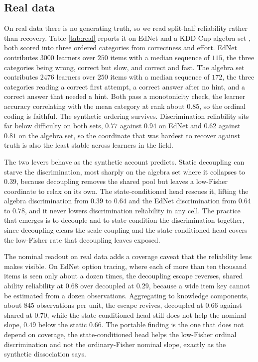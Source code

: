 \documentclass[sigconf,nonacm,screen]{acmart}
\begin{document}
\subsection{Real data}
\label{sec:real}
On real data there is no generating truth, so we read split-half reliability rather
than recovery. Table \ref{tab:real} reports it on EdNet \cite{choi_ednet_2020} and a
KDD Cup algebra set \cite{stamper_kdd_2010}, both scored into three ordered
categories from correctness and effort. EdNet contributes $3000$ learners over $250$
items with a median sequence of $115$, the three categories being wrong, correct but
slow, and correct and fast. The algebra set contributes $2476$ learners over $250$
items with a median sequence of $172$, the three categories reading a correct first
attempt, a correct answer after no hint, and a correct answer that needed a hint.
Both pass a monotonicity check, the learner accuracy correlating with the mean
category at rank about $0.85$, so the ordinal coding is faithful. The synthetic
ordering survives.
Discrimination reliability sits far below difficulty on both sets, $0.77$ against
$0.94$ on EdNet and $0.62$ against $0.81$ on the algebra set, so the coordinate that
was hardest to recover against truth is also the least stable across learners in the
field.

The two levers behave as the synthetic account predicts. Static decoupling can
starve the discrimination, most sharply on the algebra set where it collapses to
$0.39$, because decoupling removes the shared pool but leaves a low-Fisher
coordinate to relax on its own. The state-conditioned head rescues it, lifting the
algebra discrimination from $0.39$ to $0.64$ and the EdNet discrimination from
$0.64$ to $0.78$, and it never lowers discrimination reliability in any cell. The
practice that emerges is to decouple and to state-condition the discrimination
together, since decoupling clears the scale coupling and the state-conditioned head
covers the low-Fisher rate that decoupling leaves exposed.

The nominal readout on real data adds a coverage caveat that the reliability lens
makes visible. On EdNet option tracing, where each of more than ten thousand items
is seen only about a dozen times, the decoupling escape reverses, shared ability
reliability at $0.68$ over decoupled at $0.29$, because a wide item key cannot be
estimated from a dozen observations. Aggregating to knowledge components, about
$845$ observations per unit, the escape revives, decoupled at $0.66$ against shared
at $0.70$, while the state-conditioned head still does not help the nominal slope,
$0.49$ below the static $0.66$. The portable finding is the one that does not depend
on coverage, the state-conditioned head helps the low-Fisher ordinal discrimination
and not the ordinary-Fisher nominal slope, exactly as the synthetic dissociation
says.
\end{document}
